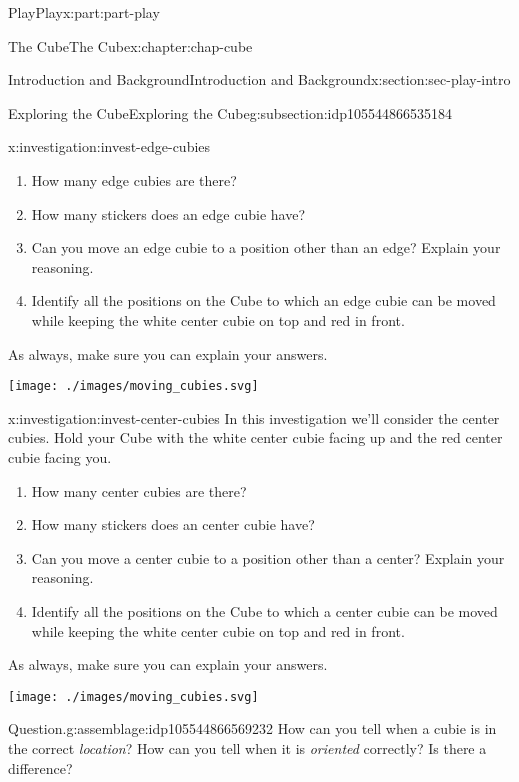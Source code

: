 \documentclass[oneside,10pt,]{book}
\numberwithin{equation}{section}
\begin{document}
\begin{partptx}{Play}{}{Play}{}{}{x:part:part-play}
\begin{chapterptx}{The Cube}{}{The Cube}{}{}{x:chapter:chap-cube}
\begin{sectionptx}{Introduction and Background}{}{Introduction and Background}{}{}{x:section:sec-play-intro}
\begin{subsectionptx}{Exploring the Cube}{}{Exploring the Cube}{}{}{g:subsection:idp105544866535184}
\begin{investigation}{}{x:investigation:invest-edge-cubies}
\begin{enumerate}
\item{}How many edge cubies are there?%
\item{}How many stickers does an edge cubie have?%
\item{}Can you move an edge cubie to a position other than an edge? Explain your reasoning.%
\item{}Identify all the positions on the Cube to which an edge cubie can be moved while keeping the white center cubie on top and red in front.%
\end{enumerate}
As always, make sure you can explain your answers.%
\begin{image}{0.25}{0.5}{0.25}%
\texttt{[image: ./images/moving\_cubies.svg]}
\end{image}%
\end{investigation}%
\begin{investigation}{}{x:investigation:invest-center-cubies}%
In this investigation we'll consider the center cubies. Hold your Cube with the white center cubie facing up and the red center cubie facing you.%
\begin{enumerate}
\item{}How many center cubies are there?%
\item{}How many stickers does an center cubie have?%
\item{}Can you move a center cubie to a position other than a center? Explain your reasoning.%
\item{}Identify all the positions on the Cube to which a center cubie can be moved while keeping the white center cubie on top and red in front.%
\end{enumerate}
As always, make sure you can explain your answers.%
\begin{image}{0.25}{0.5}{0.25}%
\texttt{[image: ./images/moving\_cubies.svg]}
\end{image}%
\end{investigation}%
\begin{assemblage}{Question.}{g:assemblage:idp105544866569232}%
How can you tell when a cubie is in the correct \emph{location}? How can you tell when it is \emph{oriented} correctly? Is there a difference?\footnotemark{}%
\end{assemblage}
%
\end{subsectionptx}
\end{sectionptx}
%
%
\typeout{************************************************}

\end{chapterptx}
\end{partptx}
\end{document}
